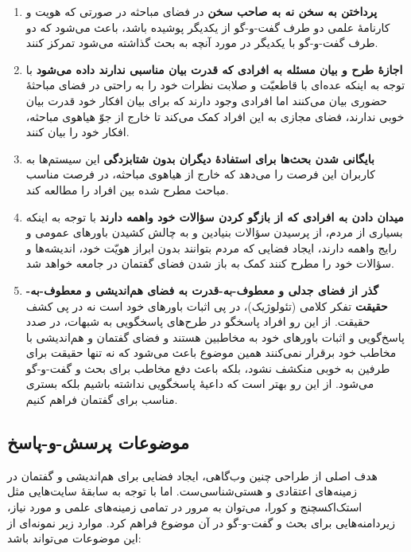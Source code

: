 \documentclass[]{article}
\begin{document}
\begin{enumerate}
\def\labelenumi{\arabic{enumi}.}
\itemsep1pt\parskip0pt
\item
  \textbf{پرداختن به سخن نه به صاحب سخن} در فضای مباحثه در صورتی که هویت
  و کارنامهٔ علمی دو طرف گفت-و-گو از یکدیگر پوشیده باشد، باعث می‌شود که
  دو طرف گفت-و-گو با یکدیگر در مورد آنچه به بحث گذاشته می‌شود تمرکز
  کنند.
\item
  \textbf{اجازهٔ طرح و بیان مسئله به افرادی که قدرت بیان مناسبی ندارند
  داده می‌شود} با توجه به اینکه عده‌ای با قاطعیّت و صلابت نظرات خود را
  به راحتی در فضای مباحثهٔ حضوری بیان می‌کنند اما افرادی وجود دارند که
  برای بیان افکار خود قدرت بیان خوبی ندارند، فضای مجازی به این افراد کمک
  می‌کند تا خارج از جوّ هیاهوی مباحثه، افکار خود را بیان کنند.
\item
  \textbf{بایگانی شدن بحث‌ها برای استفادهٔ دیگران بدون شتابزدگی} این
  سیستم‌ها به کاربران این فرصت را می‌دهد که خارج از هیاهوی مباحثه، در
  فرصت مناسب مباحث مطرح شده بین افراد را مطالعه کند.
\item
  \textbf{میدان دادن به افرادی که از بازگو کردن سؤالات خود واهمه دارند}
  با توجه به اینکه بسیاری از مردم، از پرسیدن سؤالات بنیادین و به چالش
  کشیدن باورهای عمومی و رایج واهمه دارند، ایجاد فضایی که مردم بتوانند
  بدون ابراز هویّت خود، اندیشه‌ها و سؤالات خود را مطرح کنند کمک به باز
  شدن فضای گفتمان در جامعه خواهد شد.
\item
  \textbf{گذر از فضای جدلی و معطوف-به-قدرت به فضای هم‌اندیشی و
  معطوف-به-حقیقت} تفکر کلامی (تئولوژیک)، در پی اثبات باورهای خود است نه
  در پی کشف حقیقت. از این رو افراد پاسخگو در طرح‌های پاسخگویی به شبهات،
  در صدد پاسخ‌گویی و اثبات باورهای خود به مخاطبین هستند و فضای گفتمان و
  هم‌اندیشی با مخاطب خود برقرار نمی‌کنند همین موضوع باعث می‌شود که نه
  تنها حقیقت برای طرفین به خوبی منکشف نشود، بلکه باعث دفع مخاطب برای بحث
  و گفت-و-گو می‌شود. از این رو بهتر است که داعیهٔ پاسخگویی نداشته باشیم
  بلکه بستری مناسب برای گفتمان فراهم کنیم.
\end{enumerate}

\subsection{موضوعات
پرسش-و-پاسخ}\label{ux645ux648ux636ux648ux639ux627ux62a-ux67eux631ux633ux634-ux648-ux67eux627ux633ux62e}

هدف اصلی از طراحی چنین وب‌گاهی، ایجاد فضایی برای هم‌اندیشی و گفتمان در
زمینه‌های اعتقادی و هستی‌شناسی‌ست. اما با توجه به سابقهٔ سایت‌هایی مثل
استک‌اکسچنج و کورا، می‌توان به مرور در تمامی زمینه‌های علمی و مورد نیاز،
زیردامنه‌هایی برای بحث و گفت-و-گو در آن موضوع فراهم کرد. موارد زیر
نمونه‌ای از این موضوعات می‌تواند باشد:
\end{document}
